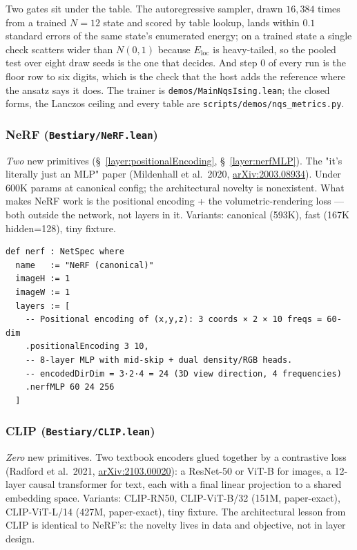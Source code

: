 Two gates sit under the table. The autoregressive sampler,
drawn $16{,}384$ times from a trained $N = 12$ state and scored by table
lookup, lands within $0.1$ standard errors of the same state's enumerated
energy; on a trained state a single check scatters wider than $N(0, 1)$
because $E_{\mathrm{loc}}$ is heavy-tailed, so the pooled test over eight
draw seeds is the one that decides. And step 0 of every run is the floor
row to six digits, which is the check that the host adds the reference
where the ansatz says it does. The trainer is
\texttt{demos/MainNqsIsing.lean}; the closed forms, the Lanczos ceiling and
every table are \texttt{scripts/demos/\allowbreak nqs\_metrics.py}.

\subsubsection*{NeRF (\texttt{Bestiary/NeRF.lean})}
\emph{Two} new primitives (\S~\ref{layer:positionalEncoding},
\S~\ref{layer:nerfMLP}). The "it's literally just an MLP" paper
(Mildenhall et al.\ 2020,
\href{https://arxiv.org/abs/2003.08934}{arXiv:2003.08934}). Under 600K params at canonical
config; the architectural novelty is nonexistent. What makes NeRF work
is the positional encoding + the volumetric-rendering loss ---
both outside the network, not layers in it. Variants:
canonical (593K), fast (167K hidden=128), tiny fixture.

\begin{verbatim}
def nerf : NetSpec where
  name   := "NeRF (canonical)"
  imageH := 1
  imageW := 1
  layers := [
    -- Positional encoding of (x,y,z): 3 coords × 2 × 10 freqs = 60-dim
    .positionalEncoding 3 10,
    -- 8-layer MLP with mid-skip + dual density/RGB heads.
    -- encodedDirDim = 3·2·4 = 24 (3D view direction, 4 frequencies)
    .nerfMLP 60 24 256
  ]
\end{verbatim}

\subsubsection*{CLIP (\texttt{Bestiary/CLIP.lean})}
\emph{Zero} new primitives. Two textbook encoders glued together by a
contrastive loss (Radford et al.\ 2021,
\href{https://arxiv.org/abs/2103.00020}{arXiv:2103.00020}): a ResNet-50 or ViT-B for images, a 12-layer causal
transformer for text, each with a final linear projection to a shared
embedding space. Variants: CLIP-RN50, CLIP-ViT-B/32 (151M, paper-exact),
CLIP-ViT-L/14 (427M, paper-exact), tiny fixture. The architectural
lesson from CLIP is identical to NeRF's: the novelty lives in data and
objective, not in layer design.

